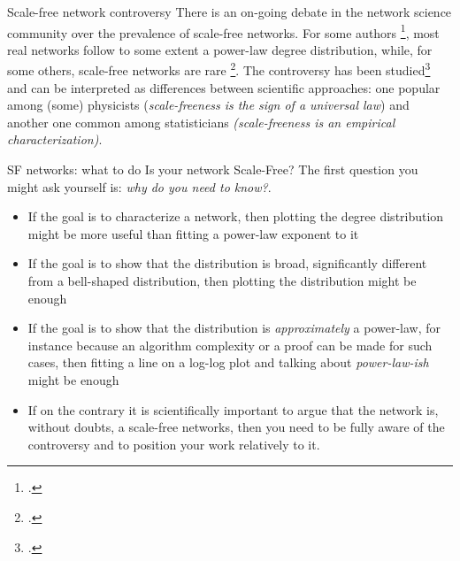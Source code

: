 \begin{textbox}{Scale-free network controversy}
    There is an on-going debate in the network science community over the prevalence of scale-free networks. For some authors \footcite{barabasi2003scale}, most real networks follow to some extent a power-law degree distribution, while, for some others, scale-free networks are rare \footcite{broido2019scale}. The controversy has been studied\footcite{jacomy2020epistemic} and can be interpreted as differences between scientific approaches: one popular among (some) physicists (\textit{scale-freeness is the sign of a universal law}) and another one common among statisticians \textit{(scale-freeness is an empirical characterization)}.
\end{textbox}

\begin{textbox}{SF networks: what to do}
    Is your network Scale-Free? The first question you might ask yourself is: \textit{why do you need to know?}.
    \begin{itemize}
        \item If the goal is to characterize a network, then plotting the degree distribution might be more useful than fitting a power-law exponent to it
        \item If the goal is to show that the distribution is broad, significantly different from a bell-shaped distribution, then plotting the distribution might be enough
        \item If the goal is to show that the distribution is \textit{approximately} a power-law, for instance because an algorithm complexity or a proof can be made for such cases, then fitting a line on a log-log plot and talking about \textit{power-law-ish} might be enough
        \item If on the contrary it is scientifically important to argue that the network is, without doubts, a scale-free networks, then you need to be fully aware of the controversy and to position your work relatively to it.
    \end{itemize}
\end{textbox}
